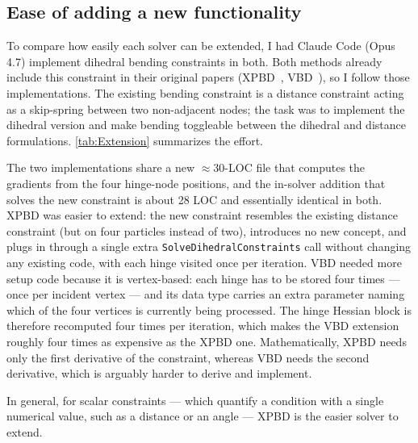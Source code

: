 \subsection{Ease of adding a new functionality}
\label{ssec:NewFunctionality}

To compare how easily each solver can be extended, I had Claude Code (Opus 4.7) implement
dihedral bending constraints in both. Both methods already include this
constraint in their original papers (XPBD~\cite{10.1145/2994258.2994272}, VBD~\cite{Chen2024}), so I follow those implementations. The
existing bending constraint is a distance constraint acting as a skip-spring
between two non-adjacent nodes; the task was to implement the dihedral version and
make bending toggleable between the dihedral and distance formulations.
\autoref{tab:Extension} summarizes the effort.

The two implementations share a new $\approx$30-LOC file that computes the
gradients from the four hinge-node positions, and the in-solver addition that
solves the new constraint is about 28 LOC and essentially identical in both. XPBD
was easier to extend: the new constraint resembles the existing distance
constraint (but on four particles instead of two), introduces no new concept, and
plugs in through a single extra \texttt{SolveDihedralConstraints} call without
changing any existing code, with each hinge visited once per iteration. VBD needed
more setup code because it is vertex-based: each hinge has to be stored four times
--- once per incident vertex --- and its data type carries an extra parameter
naming which of the four vertices is currently being processed. The hinge Hessian
block is therefore recomputed four times per iteration, which makes the VBD
extension roughly four times as expensive as the XPBD one. Mathematically, XPBD
needs only the first derivative of the constraint, whereas VBD needs the second
derivative, which is arguably harder to derive and implement.

In general, for scalar constraints --- which quantify a condition with a single
numerical value, such as a distance or an angle --- XPBD is the easier solver to
extend.

